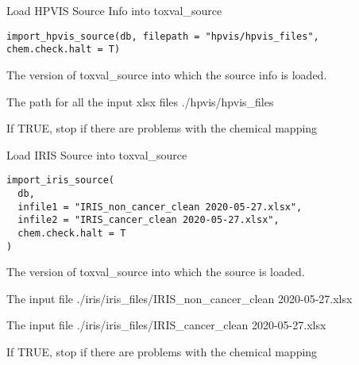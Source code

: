 \documentclass[letterpaper]{book}
\begin{document}
%
\begin{Description}\relax
Load HPVIS Source Info into toxval\_source
\end{Description}
%
\begin{Usage}
\begin{verbatim}
import_hpvis_source(db, filepath = "hpvis/hpvis_files", chem.check.halt = T)
\end{verbatim}
\end{Usage}
%
\begin{Arguments}
\begin{ldescription}
\item[\code{db}] The version of toxval\_source into which the source info is loaded.

\item[\code{filepath}] The path for all the input xlsx files ./hpvis/hpvis\_files

\item[\code{chem.check.halt}] If TRUE, stop if there are problems with the chemical mapping
\end{ldescription}
\end{Arguments}
%
\begin{Description}\relax
Load IRIS Source into toxval\_source
\end{Description}
%
\begin{Usage}
\begin{verbatim}
import_iris_source(
  db,
  infile1 = "IRIS_non_cancer_clean 2020-05-27.xlsx",
  infile2 = "IRIS_cancer_clean 2020-05-27.xlsx",
  chem.check.halt = T
)
\end{verbatim}
\end{Usage}
%
\begin{Arguments}
\begin{ldescription}
\item[\code{db}] The version of toxval\_source into which the source is loaded.

\item[\code{infile1}] The input file ./iris/iris\_files/IRIS\_non\_cancer\_clean 2020-05-27.xlsx

\item[\code{infile2}] The input file ./iris/iris\_files/IRIS\_cancer\_clean 2020-05-27.xlsx

\item[\code{chem.check.halt}] If TRUE, stop if there are problems with the chemical mapping
\end{ldescription}
\end{Arguments}
\end{document}

